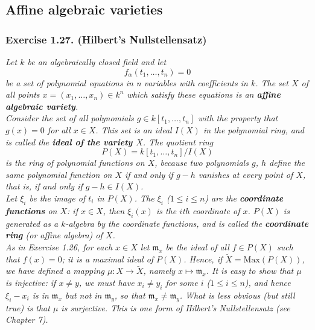 \documentclass{article}
\begin{document}



\subsection*{Affine algebraic varieties \\}



\subsubsection*{Exercise 1.27. (Hilbert's Nullstellensatz)}
\emph{Let $k$ be an algebraically closed field and let
\[
  f_{\alpha}(t_1, \ldots, t_n) = 0
\]
be a set of polynomial equations in n variables with coefficients in $k$.
The set $X$ of all points $x = (x_1, \ldots, x_n) \in k^n$ which satisfy these equations is
an \textbf{affine algebraic variety}.} \\

\emph{Consider the set of all polynomials $g \in k[t_1, \ldots, t_n]$ with the property that
$g(x) = 0$ for all $x \in X$.
This set is an ideal $I(X)$ in the polynomial ring,
and is called the \textbf{ideal of the variety $X$}.
The quotient ring
\[
  P(X) = k[t_1, \ldots, t_n]/I(X)
\]
is the ring of polynomial functions on $X$,
because two polynomials $g$, $h$ define the same polynomial function on $X$ if and only if
$g - h$ vanishes at every point of $X$, that is, if and only if $g - h \in I(X)$.} \\

\emph{Let $\xi_i$ be the image of $t_i$ in $P(X)$.
The $\xi_i$ ($1 \leq i \leq n$) are the \textbf{coordinate functions} on $X$:
if $x \in X$, then $\xi_i(x)$ is the $i$th coordinate of $x$.
$P(X)$ is generated as a $k$-algebra by the coordinate functions,
and is called the \textbf{coordinate ring} (or affine algebra) of $X$.} \\

\emph{As in Exercise 1.26,
for each $x \in X$ let $\mathfrak{m}_x$ be the ideal of all $f \in P(X)$ such that $f(x) = 0$;
it is a maximal ideal of $P(X)$.
Hence, if $\widetilde{X} = \mathrm{Max}(P(X))$, we have defined a mapping $\mu: X \to \widetilde{X}$,
namely $x \mapsto \mathfrak{m}_x$.
It is easy to show that $\mu$ is injective: if $x \neq y$,
we must have $x_i \neq y_i$ for some $i$ ($1 \leq i \leq n$),
and hence $\xi_i - x_i$ is in $\mathfrak{m}_x$ but not in $\mathfrak{m}_y$,
so that $\mathfrak{m}_x \neq \mathfrak{m}_y$.
What is less obvious (but still true) is that $\mu$ is surjective.
This is one form of Hilbert's Nullstellensatz (see Chapter 7).} \\
\end{document}
